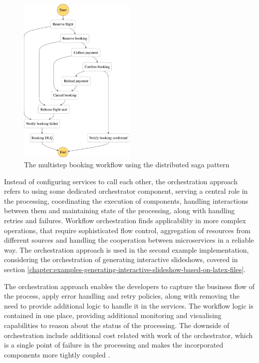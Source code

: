 \begin{figure}[]
   \centering
   \includegraphics[width=0.5\textwidth]{assets/04-serverless-for-web-apps/saga.png}
   \caption{The multistep booking workflow using the distributed saga pattern}
   \label{fig:saga-orchestration-diagram}
\end{figure}


Instead of configuring services to call each other, the orchestration approach refers to using some dedicated orchestrator component, serving a central role in the processing, coordinating the execution of components, handling interactions between them and maintaining state of the processing, along with handling retries and failures.
Workflow orchestration finds applicability in more complex operations, that require sophisticated flow control, aggregation of resources from different sources and handling the cooperation between microservices in a reliable way.
The orchestration approach is used in the second example implementation, considering the orchestration of generating interactive slideshows, covered in section \ref{chapter:examples-generating-interactive-slideshow-based-on-latex-files}.

The orchestration approach enables the developers to capture the business flow of the process, apply error handling and retry policies, along with removing the need to provide additional logic to handle it in the services.
The workflow logic is contained in one place, providing additional monitoring and visualising capabilities to reason about the status of the processing.
The downside of orchestration include additional cost related with work of the orchestrator, which is a single point of failure in the processing and makes the incorporated components more tightly coupled \cite{ChoreographyVsOrchestrationInServerlessMicroservices}.

